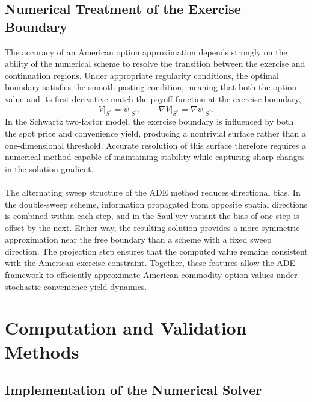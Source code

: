 \documentclass[12pt,a4paper]{article}
\begin{document}
\subsection{Numerical Treatment of the Exercise Boundary}

The accuracy of an American option approximation depends strongly on the ability of the numerical scheme to resolve the transition between the exercise and continuation regions. Under appropriate regularity conditions, the optimal boundary satisfies the smooth pasting condition, meaning that both the option value and its first derivative match the payoff function at the exercise boundary,
\begin{equation}
V\big|_{S^*}=\psi\big|_{S^*},\qquad \nabla V\big|_{S^*}=\nabla\psi\big|_{S^*}.
\end{equation}
In the Schwartz two-factor model, the exercise boundary is influenced by both the spot price and convenience yield, producing a nontrivial surface rather than a one-dimensional threshold. Accurate resolution of this surface therefore requires a numerical method capable of maintaining stability while capturing sharp changes in the solution gradient.\\\\
The alternating sweep structure of the ADE method reduces directional bias. In the double-sweep scheme, information propagated from opposite spatial directions is combined within each step, and in the Saul'yev variant the bias of one step is offset by the next. Either way, the resulting solution provides a more symmetric approximation near the free boundary than a scheme with a fixed sweep direction. The projection step ensures that the computed value remains consistent with the American exercise constraint. Together, these features allow the ADE framework to efficiently approximate American commodity option values under stochastic convenience yield dynamics.

\newpage


\section{Computation and Validation Methods}\label{ch:validation}

\subsection{Implementation of the Numerical Solver}
\end{document}
